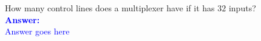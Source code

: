 \item{}
How many control lines does a multiplexer have if it has $32$ inputs?\\[12pt]
\ifanswers
\textcolor{blue}{
\textbf{Answer:}\\[12pt]
Answer goes here
}
\newpage
\fi

